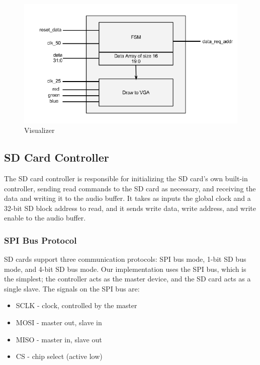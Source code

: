 \documentclass{article}
\begin{document}
\begin{figure}[H]
	\centering
	\includegraphics[scale=0.5]{viz_block_diagram.png}
	\caption{Visualizer}
\end{figure}

\subsection{SD Card Controller}

The SD card controller is responsible for initializing the SD card's own
built-in controller, sending read commands to the SD card as necessary, and
receiving the data and writing it to the audio buffer.  It takes as inputs the
global clock and a 32-bit SD block address to read, and it sends write data,
write address, and write enable to the audio buffer.

\subsubsection{SPI Bus Protocol}

SD cards support three communication protocols: SPI bus mode, 1-bit SD bus
mode, and 4-bit SD bus mode. Our implementation uses the SPI bus, which is the
simplest; the controller acts as the master device, and the SD card acts as a
single slave.  The signals on the SPI bus are:

\begin{itemize}
	\item SCLK - clock, controlled by the master
	\item MOSI - master out, slave in
	\item MISO - master in, slave out
	\item CS - chip select (active low)
\end{itemize}
\end{document}
